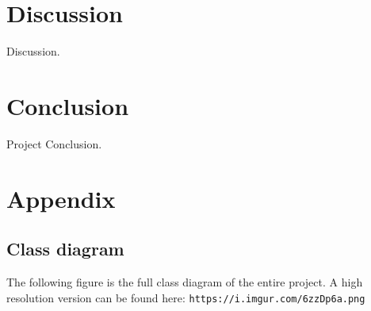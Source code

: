 \documentclass[12p]{article}
\begin{document}
\newpage
\section{Discussion}

Discussion.


\newpage
\section{Conclusion}

Project Conclusion.


\newpage
\printbibliography[heading=bibintoc,title={References}]


\newpage
\appendix

\section{Appendix}

\subsection{Class diagram} \label{AppendixClassDiagramFull}

The following figure is the full class diagram of the entire project. A high resolution version can be found here: \texttt{https://i.imgur.com/6zzDp6a.png}
\end{document}
